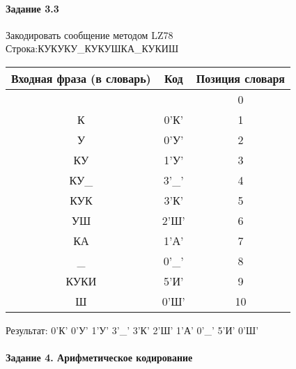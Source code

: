 \documentclass[a4paper, 12pt]{article}
\begin{document}
\paragraph{Задание 3.3}

Закодировать сообщение методом LZ78\\
Строка:КУКУКУ\_КУКУШКА\_КУКИШ\\
\begin{table}[h!]
\centering
\begin{tabular}{|c|c|c|} 
\hline
 Входная фраза (в словарь) & Код & Позиция словаря \\ \hline

 &  & 0 \\ \hline
К & 0'К' & 1 \\ \hline
У & 0'У' & 2 \\ \hline
КУ & 1'У' & 3 \\ \hline
КУ\_ & 3'\_' & 4 \\ \hline
КУК & 3'К' & 5 \\ \hline
УШ & 2'Ш' & 6 \\ \hline
КА & 1'А' & 7 \\ \hline
\_ & 0'\_' & 8 \\ \hline
КУКИ & 5'И' & 9 \\ \hline
Ш & 0'Ш' & 10 \\ \hline
\end{tabular}
\end{table}

Результат: 0'К' 0'У' 1'У' 3'\_' 3'К' 2'Ш' 1'А' 0'\_' 5'И' 0'Ш'\\
\pagebreak
\paragraph{Задание 4. Арифметическое кодирование\\}
\end{document}

